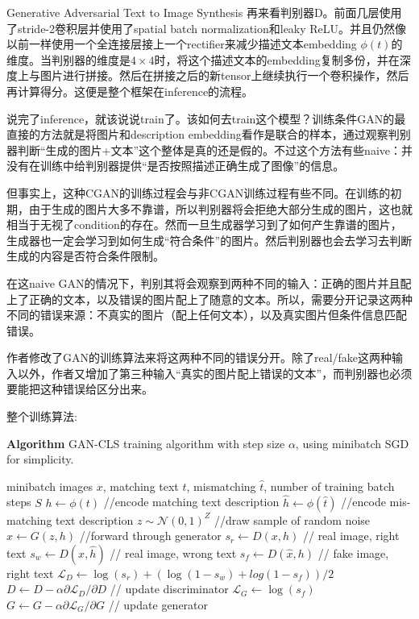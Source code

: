 \documentclass{ctexart}
\begin{document}
\begin{section}{Generative Adversarial Text to Image Synthesis}
		再来看判别器D。前面几层使用了stride-2卷积层并使用了spatial batch normalization和leaky ReLU。并且仍然像以前一样使用一个全连接层接上一个rectifier来减少描述文本embedding $\phi(t)$的维度。当判别器的维度是$4\times 4$时，将这个描述文本的embedding复制多份，并在深度上与图片进行拼接。然后在拼接之后的新tensor上继续执行一个卷积操作，然后再计算得分。这便是整个框架在inference的流程。
		
		说完了inference，就该说说train了。该如何去train这个模型？训练条件GAN的最直接的方法就是将图片和description embedding看作是联合的样本，通过观察判别器判断“生成的图片+文本”这个整体是真的还是假的。不过这个方法有些naive：并没有在训练中给判别器提供“是否按照描述正确生成了图像”的信息。
		
		但事实上，这种CGAN的训练过程会与非CGAN训练过程有些不同。在训练的初期，由于生成的图片大多不靠谱，所以判别器将会拒绝大部分生成的图片，这也就相当于无视了condition的存在。然而一旦生成器学习到了如何产生靠谱的图片，生成器也一定会学习到如何生成“符合条件”的图片。然后判别器也会去学习去判断生成的内容是否符合条件限制。
		
		在这naive GAN的情况下，判别其将会观察到两种不同的输入：正确的图片并且配上了正确的文本，以及错误的图片配上了随意的文本。所以，需要分开记录这两种不同的错误来源：不真实的图片（配上任何文本），以及真实图片但条件信息匹配错误。
		
		作者修改了GAN的训练算法来将这两种不同的错误分开。除了real/fake这两种输入以外，作者又增加了第三种输入“真实的图片配上错误的文本”，而判别器也必须要能把这种错误给区分出来。
		
		整个训练算法:
		
		\begin{algorithm}[H]
			\caption*{\textbf{Algorithm} GAN-CLS training algorithm with step size $\alpha$, using minibatch SGD for simplicity.}
			\begin{algorithmic}
				\REQUIRE minibatch images $x$, matching text $t$, mismatching $\hat{t}$, number of training batch steps $S$
				\STATE $h\leftarrow\phi(t)$ //encode matching text description
				\STATE $\hat{h}\leftarrow\phi(\hat{t})$ //encode mis-matching text description
				\STATE $z\sim\mathcal{N}(0,1)^Z$ //draw sample of random noise
				\STATE $\hat{x}\leftarrow G(z,h)$ //forward through generator
				\STATE $s_r\leftarrow D(x,h)$ // real image, right text
				\STATE $s_w\leftarrow D(x,\hat{h})$ // real image, wrong text
				\STATE $s_f\leftarrow D(\hat{x},h)$ // fake image, right text
				\STATE $\mathcal{L}_D\leftarrow\log(s_r)+(\log(1-s_w)+log(1-s_f))/2$  
				\STATE $D\leftarrow D-\alpha\partial\mathcal{L}_D/\partial D$ // update discriminator
				\STATE $\mathcal{L}_G\leftarrow\log(s_f)$
				\STATE $G\leftarrow G-\alpha\partial\mathcal{L}_G/\partial G$ // update generator
				\ENDFOR
			\end{algorithmic}
		\end{algorithm}
		

\end{section}
\end{document}

